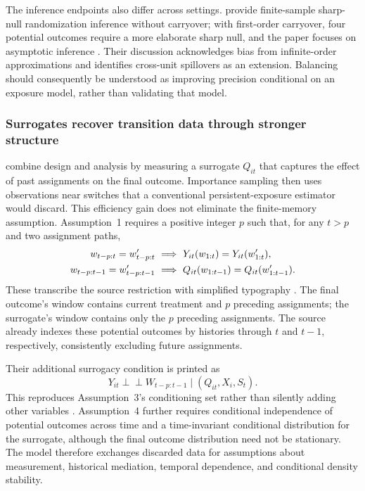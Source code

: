 The inference endpoints also differ across settings. \citet{zeng2026} provide finite-sample sharp-null randomization inference without carryover; with first-order carryover, four potential outcomes require a more elaborate sharp null, and the paper focuses on asymptotic inference \citep[Section~4.2, p.~14]{zeng2026}. Their discussion acknowledges bias from infinite-order approximations and identifies cross-unit spillovers as an extension. Balancing should consequently be understood as improving precision conditional on an exposure model, rather than validating that model.

\subsubsection{Surrogates recover transition data through stronger structure}

\citet{chen2026} combine design and analysis by measuring a surrogate $Q_{it}$ that captures the effect of past assignments on the final outcome. Importance sampling then uses observations near switches that a conventional persistent-exposure estimator would discard. This efficiency gain does not eliminate the finite-memory assumption. Assumption~1 requires a positive integer $p$ such that, for any $t>p$ and two assignment paths,
\begin{align}
 w_{t-p:t}=w'_{t-p:t}
 &\ \Longrightarrow\ Y_{it}(w_{1:t})=Y_{it}(w'_{1:t}),\notag\\
 w_{t-p:t-1}=w'_{t-p:t-1}
 &\ \Longrightarrow\ Q_{it}(w_{1:t-1})=Q_{it}(w'_{1:t-1}).
 \label{eq:chen-finite-carryover}
\end{align}
These transcribe the source restriction with simplified typography \citep[Assumption~1, p.~4857; PDF p.~4]{chen2026}. The final outcome's window contains current treatment and $p$ preceding assignments; the surrogate's window contains only the $p$ preceding assignments. The source already indexes these potential outcomes by histories through $t$ and $t-1$, respectively, consistently excluding future assignments.

Their additional surrogacy condition is printed as
\begin{equation}\label{eq:chen-surrogacy}
Y_{it}\perp\!\!\!\perp W_{t-p:t-1}\mid(Q_{it},X_i,S_t).
\end{equation}
This reproduces Assumption~3's conditioning set rather than silently adding other variables \citep[p.~4858]{chen2026}. Assumption~4 further requires conditional independence of potential outcomes across time and a time-invariant conditional distribution for the surrogate, although the final outcome distribution need not be stationary. The model therefore exchanges discarded data for assumptions about measurement, historical mediation, temporal dependence, and conditional density stability.


